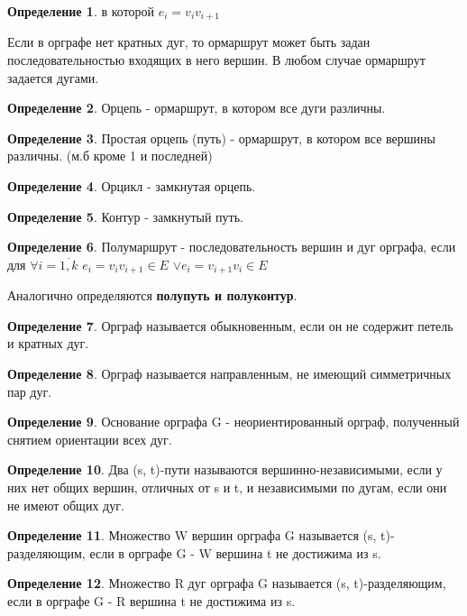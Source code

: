 \documentclass[a4paper]{article}
\theoremstyle{definition}
\newtheorem*{definition}{Определение}
\theoremstyle{remark}
\begin{document}
\begin{multicols*}{2}
\begin{definition}
        в которой $e_i = v_iv_{i+1}$
    \end{definition}
    Если в орграфе нет кратных дуг, то ормаршрут может быть задан последовательностью
    входящих в него вершин. В любом случае ормаршрут задается дугами.
    \begin{definition}
        Орцепь - ормаршрут, в котором все дуги различны.
    \end{definition}
    \begin{definition}
        Простая орцепь (путь) - ормаршрут, в котором все вершины различны. (м.б кроме 1 и последней)
    \end{definition}
    \begin{definition}
        Орцикл - замкнутая орцепь.
    \end{definition}
    \begin{definition}
        Контур - замкнутый путь.
    \end{definition}
    \begin{definition}
        Полумаршрут - последовательность вершин и дуг орграфа, если для $\forall i = \overline{1, k}$ $e_i = v_iv_{i+1}\in E$
        $\vee e_i = v_{i+1}v_i\in E$
    \end{definition}
    Аналогично определяются \textbf{полупуть и полуконтур}.
    \begin{definition}
        Орграф называется обыкновенным, если он не содержит петель и кратных дуг.
    \end{definition}
    \begin{definition}
        Орграф называется направленным, не имеющий симметричных пар дуг.
    \end{definition}
    \begin{definition}
        Основание орграфа G - неориентированный орграф, полученный снятием ориентации всех дуг.
    \end{definition}
    \begin{definition}
        Два (s, t)-пути называются вершинно-независимыми, если у них нет общих вершин, отличных от s и t, и независимыми по дугам, если они не имеют общих дуг.
    \end{definition}
    \begin{definition}
        Множество W вершин орграфа G называется (s, t)-разделяющим, если в орграфе G - W вершина t не достижима из s.
    \end{definition}
    \begin{definition}
        Множество R дуг орграфа G называется (s, t)-разделяющим, если в орграфе G - R вершина t не достижима из s.

\end{definition}
\end{multicols*}
\end{document}
